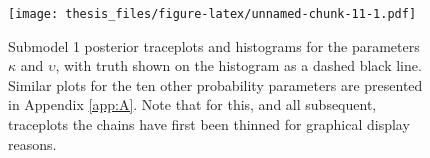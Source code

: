 \documentclass[11pt,]{book}
\begin{document}
\begin{table}[!h]

\caption{\label{tab:unnamed-chunk-10}Posterior mean (PM), true value and posterior standard deviation (PSD) for each component.}
\centering
{}
\end{table}

\begin{figure}
\centering
\texttt{[image: thesis\_files/figure-latex/unnamed-chunk-11-1.pdf]}
\caption{\label{fig:unnamed-chunk-11}Submodel 1 posterior traceplots and
histograms for the parameters \(\kappa\) and \(\upsilon\), with truth
shown on the histogram as a dashed black line. Similar plots for the ten
other probability parameters are presented in Appendix \ref{app:A}. Note
that for this, and all subsequent, traceplots the chains have first been
thinned for graphical display reasons.}
\end{figure}

\newpage
\end{document}

